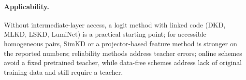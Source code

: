 \paragraph{Applicability.} Without intermediate-layer access, a logit method with linked code
(DKD, MLKD, LSKD, LumiNet) is a practical starting point; for accessible homogeneous pairs, SimKD or a projector-based feature method is stronger on the reported numbers; reliability methods address teacher errors; online schemes avoid a fixed pretrained teacher, while data-free schemes address lack of original training data and still require a teacher.

